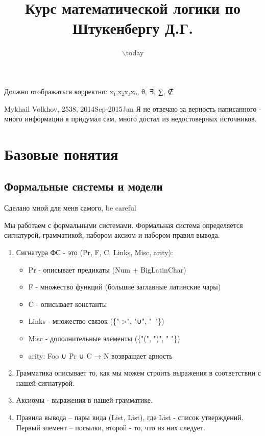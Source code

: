 \documentclass[11pt]{article}
\date{$\backslash$today}
\title{Курс математической логики по Штукенбергу Д.Г.}
\begin{document}
\maketitle
\tableofcontents

Должно отображаться корректно: x₁,x₂x₃xₙ, θ, ∃, ∑, ∉

Mykhail Volkhov, 2538, 2014Sep-2015Jan
Я не отвечаю за верность написанного - много информации
я придумал сам, много достал из недостоверных источников.

\section{Базовые понятия}
\label{sec-1}
\subsection{Формальные системы и модели}
\label{sec-1-1}
Сделано мной для меня самого, be careful

Мы работаем с формальными системами.
Формальная система определяется сигнатурой, грамматикой,
набором аксиом и набором правил вывода.
\begin{enumerate}
\item Сигнатура ФС - это (Pr, F, C, Links, Misc, arity):
\begin{itemize}
\item Pr - описывает предикаты (Num + BigLatinChar)
\item F - множество функций (большие заглавные латинские чары)
\item C - описывает константы
\item Links - множество связок (\{"->", "∪", " "\})
\item Misc - дополнительные элементы (\{"(", ")", " "\})
\item arity: Foo ∪ Pr ∪ C → N возвращает арность
\end{itemize}
\item Грамматика описывает то, как мы можем строить выражения
в соответствии с нашей сигнатурой.
\item Аксиомы - выражения в нашей грамматике.
\item Правила вывода – пары вида (List, List), где List -
список утверждений. Первый элемент – посылки, второй -
то, что из них следует.
\end{enumerate}
\end{document}
